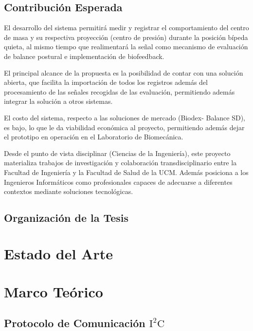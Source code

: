 \documentclass[12pt,a4paper]{article}
\let\stdsection\section
\renewcommand\section{\newpage\stdsection}
\begin{document}
\subsection{Contribución Esperada}

El desarrollo del sistema permitirá medir y registrar el comportamiento del centro de masa y su respectiva proyección (centro de presión) durante la posición bípeda quieta, al mismo tiempo que realimentará la señal como mecanismo de evaluación de balance postural e implementación de biofeedback.

El principal alcance de la propuesta es la posibilidad de contar con una solución abierta, que facilita la importación de todos los registros además del procesamiento de las señales recogidas de las evaluación, permitiendo además integrar la solución a otros sistemas.
 
El costo del sistema, respecto a las soluciones de mercado (Biodex- Balance SD), es bajo, lo que le da viabilidad económica al proyecto, permitiendo además dejar el prototipo en operación en el Laboratorio de Biomecánica. 

Desde el punto de vista disciplinar (Ciencias de la Ingeniería), este proyecto materializa trabajos de investigación y colaboración transdisciplinario entre la Facultad de Ingeniería y la Facultad de Salud de la UCM. Además posiciona a los Ingenieros Informáticos como profesionales capaces de adecuarse a diferentes contextos mediante soluciones tecnológicas.
\subsection{Organizaci\'on de la Tesis}



\section{Estado del Arte}




\section{Marco Te\'orico}

\subsection{Protocolo de Comunicación $\mathbf{\mathrm{I^2C}}$}
\end{document}
